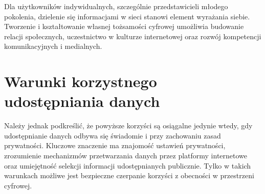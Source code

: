 Dla użytkowników indywidualnych, szczególnie przedstawicieli młodego pokolenia, dzielenie się informacjami w sieci stanowi element wyrażania siebie. Tworzenie i kształtowanie własnej tożsamości cyfrowej umożliwia budowanie relacji społecznych, uczestnictwo w kulturze internetowej oraz rozwój kompetencji komunikacyjnych i medialnych.\cite{CENTRUM}

\section{Warunki korzystnego udostępniania danych}

Należy jednak podkreślić, że powyższe korzyści są osiągalne jedynie wtedy, gdy udostępnianie danych odbywa się świadomie i przy zachowaniu zasad prywatności. Kluczowe znaczenie ma znajomość ustawień prywatności, zrozumienie mechanizmów przetwarzania danych przez platformy internetowe oraz umiejętność selekcji informacji udostępnianych publicznie. Tylko w takich warunkach możliwe jest bezpieczne czerpanie korzyści z obecności w przestrzeni cyfrowej.
